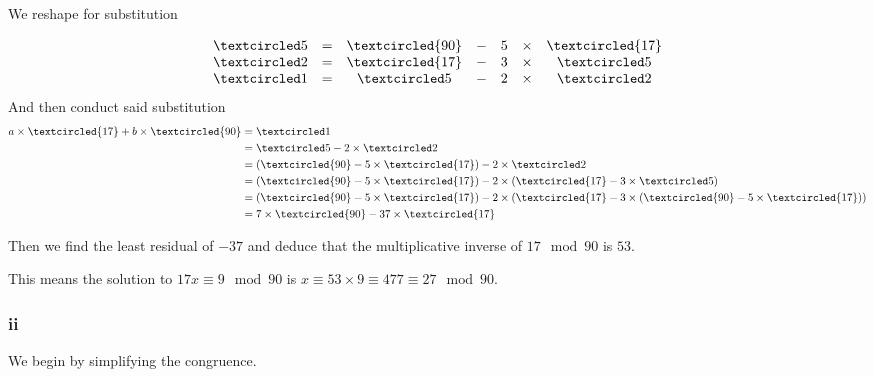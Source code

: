 \documentclass{article}
\begin{document}
We reshape for substitution

$$\begin{matrix}
		\textcircled 5 & = & \textcircled {90} & - & 5 & \times & \textcircled {17} \\
		\textcircled 2 & = & \textcircled {17} & - & 3 & \times & \textcircled 5    \\
		\textcircled 1 & = & \textcircled 5    & - & 2 & \times & \textcircled 2
	\end{matrix}$$
And then conduct said substitution
\begin{align*}
	a \times \textcircled {17} + b \times \textcircled {90} & = \textcircled 1                                                                                                                               \\
	                                                        & = \textcircled 5     -  2  \times \textcircled 2                                                                                               \\
	                                                        & = (\textcircled {90}  -  5  \times  \textcircled {17})-  2  \times \textcircled 2                                                              \\
	                                                        & = (\textcircled {90}  -  5  \times  \textcircled {17})-  2  \times (\textcircled {17} - 3 \times \textcircled 5)                               \\
	                                                        & = (\textcircled {90} - 5 \times \textcircled {17}) - 2 \times (\textcircled {17} - 3 \times (\textcircled {90} - 5  \times \textcircled {17})) \\
	                                                        & = 7 \times \textcircled {90} - 37  \times \textcircled {17}
\end{align*}

Then we find the least residual of $-37$ and deduce that the multiplicative inverse of $17 \mod 90$ is $53$.

This means the solution to $17 x \equiv 9 \mod 90$ is $x \equiv 53 \times 9 \equiv 477 \equiv 27 \mod 90$.

\subsubsection{ii}

We begin by simplifying the congruence.
\end{document}
